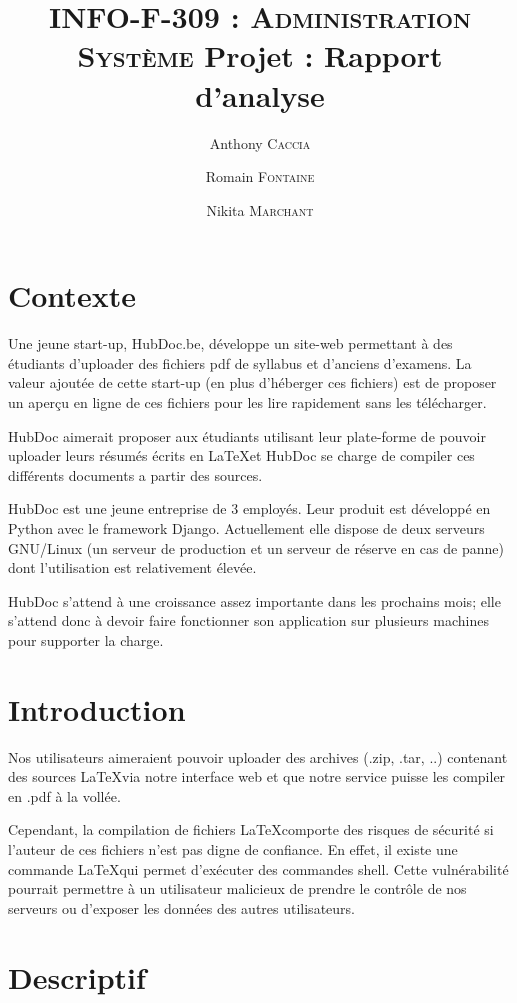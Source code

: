 \documentclass[10pt,a4paper]{article}
\author{Anthony \textsc{Caccia} \and Romain \textsc{Fontaine} \and Nikita \textsc{Marchant} }
\date{}
\title{\textsc{INFO-F-309 : Administration Système} Projet : Rapport d'analyse}
\begin{document}
\maketitle

\section{Contexte}

Une jeune start-up, HubDoc.be, développe un site-web permettant à des étudiants d'uploader des fichiers pdf de syllabus et d'anciens d'examens.
La valeur ajoutée de cette start-up (en plus d'héberger ces fichiers) est de proposer un aperçu en ligne de ces fichiers pour les lire rapidement sans les télécharger.

HubDoc aimerait proposer aux étudiants utilisant leur plate-forme de pouvoir uploader leurs résumés écrits en \LaTeX et HubDoc se charge de compiler ces différents documents a partir des sources.

HubDoc est une jeune entreprise de 3 employés.
Leur produit est développé en Python avec le framework Django.
Actuellement elle dispose de deux serveurs GNU/Linux (un serveur de production et un serveur de réserve en cas de panne) dont l'utilisation est relativement élevée.

HubDoc s'attend à une croissance assez importante dans les prochains mois;
elle s'attend donc à devoir faire fonctionner son application sur plusieurs machines pour supporter la charge.


\section{Introduction}

Nos utilisateurs aimeraient pouvoir uploader des archives (.zip, .tar, ..) contenant des sources \LaTeX via notre interface web et que notre service puisse les compiler en .pdf à la vollée.

Cependant, la compilation de fichiers \LaTeX comporte des risques de sécurité si l'auteur de ces fichiers n'est pas digne de confiance.
En effet, il existe une commande \LaTeX qui permet d'exécuter des commandes shell.
Cette vulnérabilité pourrait permettre à un utilisateur malicieux de prendre le contrôle de nos serveurs ou d'exposer les données des autres utilisateurs.

\section{Descriptif}
\end{document}
